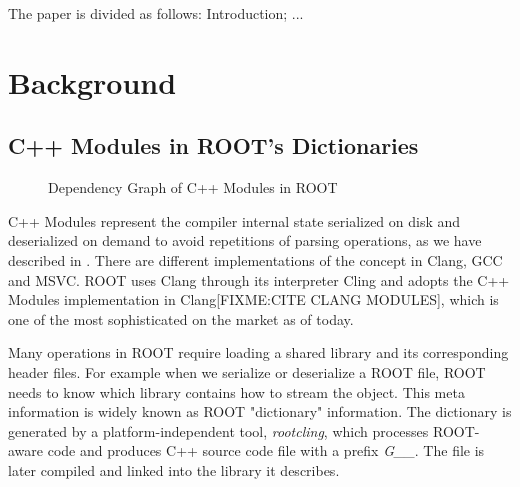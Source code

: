 \documentclass[12pt]{iopart}
\begin{document}
The paper is divided as follows: Introduction; ...

\section{Background}

\subsection{C++ Modules in ROOT's Dictionaries}
\label{intro}


\begin{figure}[!h]
  \centering
  \caption{Dependency Graph of C++ Modules in ROOT}
  \label{fig:pchandpcm}
\end{figure}

C++ Modules represent the compiler internal state serialized on disk and deserialized on demand to avoid repetitions of parsing operations, as we have described in \cite{chep-modules}. There are different implementations of the concept in Clang, GCC and MSVC. ROOT uses Clang through its interpreter Cling and adopts the C++ Modules implementation in Clang[FIXME:CITE CLANG MODULES], which is one of the most sophisticated on the market as of today.

Many operations in ROOT require loading a shared library and its corresponding header files. For example when we serialize or deserialize a ROOT file, ROOT needs to know which library contains how to stream the object. This meta information is widely known as ROOT "dictionary" information. The dictionary is generated by a platform-independent tool, \textit{rootcling}, which processes ROOT-aware code and produces C++ source code file with a prefix \textit{G\_\_}. The file is later compiled and linked into the library it describes.
\end{document}
